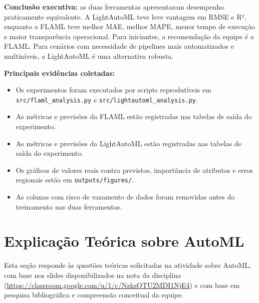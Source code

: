\documentclass[11pt, a4paper, oneside]{article}
\begin{document}
\begin{infobox}
\textbf{Conclusão executiva:} as duas ferramentas apresentaram desempenho praticamente
equivalente. A LightAutoML teve leve vantagem em RMSE e R², enquanto a FLAML teve
melhor MAE, melhor MAPE, menor tempo de execução e maior transparência operacional.
Para iniciantes, a recomendação da equipe é a FLAML. Para cenários com necessidade
de pipelines mais automatizados e multiníveis, a LightAutoML é uma alternativa robusta.
\end{infobox}

\textbf{Principais evidências coletadas:}
\begin{itemize}[leftmargin=1.5cm, itemsep=4pt]
  \item Os experimentos foram executados por scripts reprodutíveis em \texttt{src/flaml\_analysis.py} e \texttt{src/lightautoml\_analysis.py}.
  \item As métricas e previsões da FLAML estão registradas nas tabelas de saída do experimento.
  \item As métricas e previsões da LightAutoML estão registradas nas tabelas de saída do experimento.
  \item Os gráficos de valores reais contra previstos, importância de atributos e erros regionais estão em \texttt{outputs/figures/}.
  \item As colunas com risco de vazamento de dados foram removidas antes do treinamento nas duas ferramentas.
\end{itemize}

\newpage

\section{Explicação Teórica sobre AutoML}
\label{sec:automl-teoria}

\begin{infobox}
Esta seção responde às questões teóricas solicitadas na atividade sobre AutoML, com
base nos slides disponibilizados na nota da disciplina
(\url{https://classroom.google.com/u/1/c/NzkzOTU2MDI1NjE4}) e com base em
pesquisa bibliográfica e compreensão conceitual da equipe.
\end{infobox}

\end{document}
